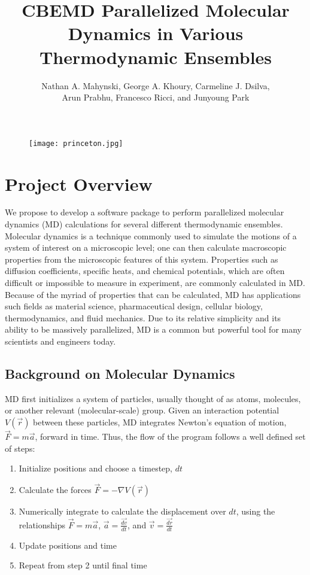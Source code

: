 \documentclass[10pt]{article}
\title{\textbf{CBEMD} Parallelized Molecular Dynamics in Various Thermodynamic Ensembles}
\author{Nathan A. Mahynski, George A. Khoury, Carmeline J. Dsilva, \\
Arun Prabhu, Francesco Ricci, and Junyoung Park}
\date{}
\begin{document}
\maketitle
\begin{figure}[htbp]
   \centering
   \texttt{[image: princeton.jpg]}
\end{figure}
\thispagestyle{empty}
\newpage
\setcounter{page}{1}
\newpage

\section{Project Overview}
We propose to develop a software package to perform parallelized molecular dynamics (MD) calculations for several different thermodynamic ensembles. Molecular dynamics is a technique commonly used to simulate the motions of a system of interest on a microscopic level; one can then calculate macroscopic properties from the microscopic features of this system. Properties such as diffusion coefficients, specific heats, and chemical potentials, which are often difficult or impossible to measure in experiment, are commonly calculated in MD.  Because of the myriad of properties that can be calculated, MD has applications such fields as material science, pharmaceutical design, cellular biology, thermodynamics, and fluid mechanics.  Due to its relative simplicity and its ability to be massively parallelized, MD is a common but powerful tool for many scientists and engineers today.

\subsection{Background on Molecular Dynamics}
MD first initializes a system of particles, usually thought of as atoms, molecules, or another relevant (molecular-scale) group.  Given an interaction potential $V (\overrightarrow{r})$ between these particles, MD integrates Newton's equation of motion, $\overrightarrow{F}=m\overrightarrow{a}$, forward in time.  Thus, the flow of the program follows a well defined set of steps:
\begin{enumerate}
    \item Initialize positions and choose a timestep, $dt$
    \item Calculate the forces $\overrightarrow{F} =  -\nabla V (\overrightarrow{r}) $
    \item Numerically integrate to calculate the displacement over $dt$, using the relationships $\overrightarrow{F}=m\overrightarrow{a}$, $\overrightarrow{a} = \frac{\overrightarrow{dv}}{dt}$, and $\overrightarrow{v} = \frac{\overrightarrow{dr}}{dt}$
    \item Update positions and time
    \item Repeat from step 2 until final time
\end{enumerate}
\end{document}

